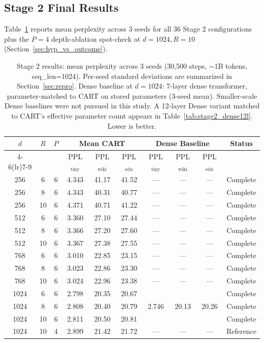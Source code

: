 \documentclass{article}
\newcommand{\pplwiki}{PPL$_\text{wiki}$}
\newcommand{\ppltiny}{PPL$_\text{tiny}$}
\newcommand{\ppledu}{PPL$_\text{edu}$}
\begin{document}
\subsection{Stage 2 Final Results}

Table~\ref{tab:stage2_results} reports mean perplexity across 3 seeds for all 36 Stage 2 configurations plus the $P{=}4$ depth-ablation spot-check at $d{=}1024, R{=}10$ (Section~\ref{sec:hyp_vs_outcome}).

\begin{table}[t]
\centering
\caption{Stage 2 results: mean perplexity across 3 seeds (30{,}500 steps, $\sim$1B tokens, seq\_len=1024). Per-seed standard deviations are summarized in Section~\ref{sec:repro}. Dense baseline at $d{=}1024$: 7-layer dense transformer, parameter-matched to CART on stored parameters (3-seed mean). Smaller-scale Dense baselines were not pursued in this study. A 12-layer Dense variant matched to CART's effective parameter count appears in Table~\ref{tab:stage2_dense12l}. Lower is better.}
\label{tab:stage2_results}
\footnotesize
\begin{tabular}{cccccccccc}
\toprule
\multirow{2}{*}{$d$} & \multirow{2}{*}{$R$} & \multirow{2}{*}{$P$} & \multicolumn{3}{c}{Mean CART} & \multicolumn{3}{c}{Dense Baseline} & \multirow{2}{*}{Status} \\
\cmidrule(lr){4-6}\cmidrule(lr){7-9}
& & & \ppltiny & \pplwiki & \ppledu & \ppltiny & \pplwiki & \ppledu & \\
\midrule
256 & 6  & 6 & 4.343 & 41.17 & 41.52 & --- & --- & --- & Complete \\
256 & 8  & 6 & 4.343 & 40.31 & 40.77 & --- & --- & --- & Complete \\
256 & 10 & 6 & 4.371 & 40.71 & 41.22 & --- & --- & --- & Complete \\
\midrule
512 & 6  & 6 & 3.360 & 27.10 & 27.44 & --- & --- & --- & Complete \\
512 & 8  & 6 & 3.366 & 27.20 & 27.60 & --- & --- & --- & Complete \\
512 & 10 & 6 & 3.367 & 27.38 & 27.55 & --- & --- & --- & Complete \\
\midrule
768 & 6  & 6 & 3.010 & 22.85 & 23.15 & --- & --- & --- & Complete \\
768 & 8  & 6 & 3.023 & 22.86 & 23.30 & --- & --- & --- & Complete \\
768 & 10 & 6 & 3.024 & 22.96 & 23.38 & --- & --- & --- & Complete \\
\midrule
1024 & 6  & 6 & 2.798 & 20.35 & 20.67 & \multirow{3}{*}{2.746} & \multirow{3}{*}{20.13} & \multirow{3}{*}{20.26} & Complete \\
1024 & 8  & 6 & 2.808 & 20.40 & 20.79 &  &  &  & Complete \\
1024 & 10 & 6 & 2.811 & 20.50 & 20.81 &  &  &  & Complete \\
\midrule
1024 & 10 & 4 & 2.899 & 21.42 & 21.72 & --- & --- & --- & Reference \\
\bottomrule
\end{tabular}
\end{table}
\end{document}
